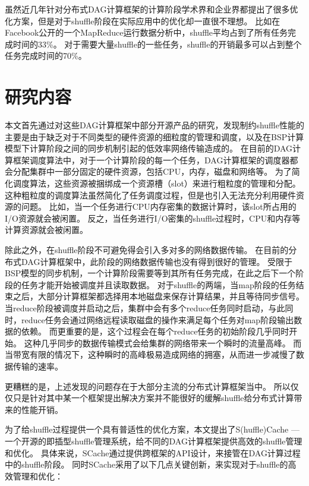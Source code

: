虽然近几年针对分布式DAG计算框架的计算阶段学术界和企业界都提出了很多优化方案\cite{pacman, babu, quincy, sync}，但是对于shuffle阶段在实际应用中的优化却一直很不理想。
比如在Facebook公开的一个MapReduce运行数据分析中，shuffle平均占到了所有任务完成时间的33\%。
对于需要大量shuffle的一些任务，shuffle的开销最多可以占到整个任务完成时间的70\%\cite{managing}。



\section{研究内容}

本文首先通过对这些DAG计算框架中部分开源产品的研究，发现制约shuffle性能的主要是由于缺乏对于不同类型的硬件资源的细粒度的管理和调度，以及在BSP计算模型下计算阶段之间的同步机制引起的低效率网络传输造成的。
在目前的DAG计算框架调度算法中，对于一个计算阶段的每一个任务，DAG计算框架的调度器都会分配集群中一部分固定的硬件资源，包括CPU，内存，磁盘和网络等。
为了简化调度算法，这些资源被捆绑成一个资源槽（slot）来进行粗粒度的管理和分配。
这种粗粒度的调度算法虽然简化了任务调度过程，但是也引入无法充分利用硬件资源的问题。
比如，当一个任务进行CPU内存密集的数据计算时，该slot所占用的I/O资源就会被闲置。
反之，当任务进行I/O密集的shuffle过程时，CPU和内存等计算资源就会被闲置。

除此之外，在shuffle阶段不可避免得会引入多对多的网络数据传输。
在目前的分布式DAG计算框架中，此阶段的网络数据传输也没有得到很好的管理。
受限于BSP模型的同步机制，一个计算阶段需要等到其所有任务完成，在此之后下一个阶段的任务才能开始被调度并且读取数据。
对于shuffle的两端，当map阶段的任务结束之后，大部分计算框架都选择用本地磁盘来保存计算结果，并且等待同步信号。
当reduce阶段被调度并启动之后，集群中会有多个reduce任务同时启动，与此同时，reduce任务会通过网络远程读取磁盘的操作来满足每个任务对map阶段输出数据的依赖。
而更重要的是，这个过程会在每个reduce任务的初始阶段几乎同时开始。
这种几乎同步的数据传输模式会给集群的网络带来一个瞬时的流量高峰。
而当带宽有限的情况下，这种瞬时的高峰极易造成网络的拥塞，从而进一步减慢了数据传输的速率。

更糟糕的是，上述发现的问题存在于大部分主流的分布式计算框架当中。
所以仅仅只是针对其中某一个框架提出解决方案并不能很好的缓解shuffle给分布式计算带来的性能开销。

为了给shuffle过程提供一个具有普适性的优化方案，本文提出了S(huffle)Cache --- 一个开源的即插型shuffle管理系统，给不同的DAG计算框架提供高效的shuffle管理和优化。
具体来说，SCache通过提供跨框架的API设计，来接管在DAG计算过程中的shuffle阶段。
同时SCache采用了以下几点关键创新，来实现对于shuffle的高效管理和优化：

